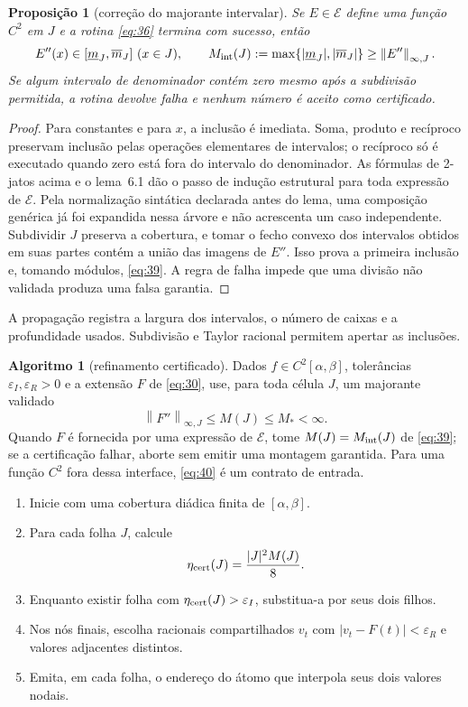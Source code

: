 \documentclass[11pt,a4paper]{article}
\theoremstyle{preciso}
\newtheorem{proposicao}[teorema]{Proposição}
\theoremstyle{definition}
\newtheorem{algoritmo}[teorema]{Algoritmo}
\newcommand{\EE}{\mathcal E}
\newcommand{\normK}[2]{\left\|#1\right\|_{\infty,#2}}
\newcommand{\eqn}[2]{\begin{equation}\label{eq:#1}#2\end{equation}}
\begin{document}
\begin{proposicao}[correção do majorante intervalar]
Se $E\in\EE$ define uma função $C^2$ em $J$ e a rotina \eqref{eq:36} termina com sucesso, então
\eqn{39}{E''(x)\in[\underline m_J,\overline m_J]\ (x\in J),\qquad
M_{\rm int}(J):=\max\{|\underline m_J|,|\overline m_J|\}\ge\normK{E''}{J}.}
Se algum intervalo de denominador contém zero mesmo após a subdivisão permitida, a rotina devolve falha e nenhum número é aceito como certificado.
\end{proposicao}
\begin{proof}
Para constantes e para $x$, a inclusão é imediata. Soma, produto e recíproco preservam inclusão pelas operações elementares de intervalos; o recíproco só é executado quando zero está fora do intervalo do denominador. As fórmulas de 2-jatos acima e o lema~6.1 dão o passo de indução estrutural para toda expressão de $\EE$. Pela normalização sintática declarada antes do lema, uma composição genérica já foi expandida nessa árvore e não acrescenta um caso independente. Subdividir $J$ preserva a cobertura, e tomar o fecho convexo dos intervalos obtidos em suas partes contém a união das imagens de $E''$. Isso prova a primeira inclusão e, tomando módulos, \eqref{eq:39}. A regra de falha impede que uma divisão não validada produza uma falsa garantia.
\end{proof}
A propagação registra a largura dos intervalos, o número de caixas e a profundidade usados. Subdivisão e Taylor racional permitem apertar as inclusões.

\begin{algoritmo}[refinamento certificado]
Dados $f\in C^2[\alpha,\beta]$, tolerâncias $\varepsilon_I,\varepsilon_R>0$ e a extensão $F$ de \eqref{eq:30}, use, para toda célula $J$, um majorante validado
\eqn{40}{\normK{F''}{J}\le M(J)\le M_*<\infty.}
Quando $F$ é fornecida por uma expressão de $\EE$, tome $M(J)=M_{\rm int}(J)$ de \eqref{eq:39}; se a certificação falhar, aborte sem emitir uma montagem garantida. Para uma função $C^2$ fora dessa interface, \eqref{eq:40} é um contrato de entrada.
\begin{enumerate}[label=(\roman*),topsep=6pt,itemsep=3pt]
\item Inicie com uma cobertura diádica finita de $[\alpha,\beta]$.
\item Para cada folha $J$, calcule
\eqn{41}{\eta_{\rm cert}(J)=\frac{|J|^2M(J)}8.}
\item Enquanto existir folha com $\eta_{\rm cert}(J)>\varepsilon_I$, substitua-a por seus dois filhos.
\item Nos nós finais, escolha racionais compartilhados $v_t$ com $|v_t-F(t)|<\varepsilon_R$ e valores adjacentes distintos.
\item Emita, em cada folha, o endereço do átomo que interpola seus dois valores nodais.
\end{enumerate}
\end{algoritmo}
\end{document}
